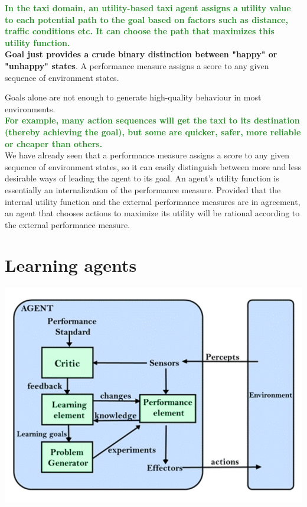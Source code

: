 \documentclass{article}
\begin{document}
\textcolor{ForestGreen}{\textbf{
    In the taxi domain, an utility-based taxi agent assigns a utility value to each potential path to the goal based on factors such as distance, traffic conditions etc. It can choose the path that maximizes this utility function.
}} \\

\textbf{Goal just provides a crude binary distinction between "happy" or "unhappy" states}. A performance measure assigns a score to any given sequence of environment states.

\newpage

Goals alone are not enough to generate high-quality behaviour in most environments. \\

\textcolor{ForestGreen}{\textbf{For example, many action sequences will get the taxi to its destination (thereby achieving the goal), but some are quicker, safer, more reliable or cheaper than others.}} \\

We have already seen that a performance measure assigns a score to any given sequence of environment states, so it can easily distinguish between more and less desirable ways of leading the agent to its goal. An agent’s utility function is essentially an internalization of the performance measure. Provided that the internal utility function and the external performance  measures  are  in  agreement,  an  agent  that  chooses  actions  to  maximize  its utility will be rational according to the external performance measure.

\newpage

\section{Learning agents}

\begin{center}
    \includegraphics[scale=0.4]{images/learning_agent.jpg}
\end{center}
\end{document}
